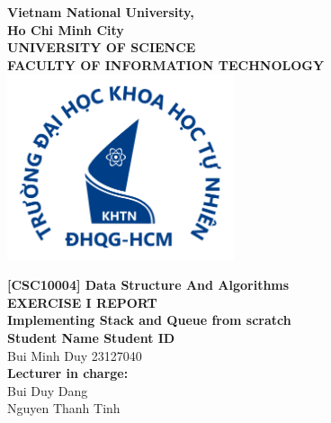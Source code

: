 \documentclass[a4paper, 12pt]{article}
\begin{document}
\begin{titlepage}
  \begin{center}
    \textbf{\LARGE Vietnam National University,}\\[0.5cm]
    \textbf{\LARGE Ho Chi Minh City}\\[0.5cm]
    \vspace{20pt}
    \textbf{\large UNIVERSITY OF SCIENCE}\\[0.2cm]
    \textbf{\large FACULTY OF INFORMATION TECHNOLOGY}\\[0.2cm]
    \vspace{20pt}
    \includegraphics[width=0.5\textwidth,keepaspectratio]{images/logo.png}

    \par
    \vspace{20pt}
    \textbf{\Large [CSC10004] Data Structure And Algorithms}\\
    \vspace{15pt}
    \myrule[1pt][7pt]
    \textbf{\LARGE EXERCISE I REPORT}\\
    \vspace{15pt}
    \textbf{\large Implementing Stack and Queue from scratch}\\
    \vspace{10pt}
    \myrule[1pt][7pt]
    \vspace{25pt}
    \textbf{\large Student Name \hspace{20pt} Student ID}\\
    Bui Minh Duy \hspace{45pt} 23127040 \\

    \vspace{45pt}
    \textbf {\large Lecturer in charge:}\\[0.2cm]
    \Large {Bui Duy Dang}\\[0.1cm]
    \Large {Nguyen Thanh Tinh}\\[0.1cm]
  \end{center}

  \par
  \vfill
  \begin{center}
    \\
  \end{center}

\end{titlepage}
\end{document}
